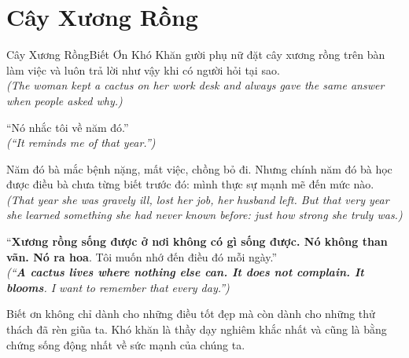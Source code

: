 \section{Cây Xương Rồng}
\begin{truyen}{Cây Xương Rồng}{Biết Ơn Khó Khăn}
gười phụ nữ đặt cây xương rồng trên bàn làm việc và luôn trả lời như vậy khi có người hỏi tại sao.\\
\textit{(The woman kept a cactus on her work desk and always gave the same answer when people asked why.)}

``Nó nhắc tôi về năm đó.''\\
\textit{(``It reminds me of that year.'')}

Năm đó bà mắc bệnh nặng, mất việc, chồng bỏ đi. Nhưng chính năm đó bà học được điều bà chưa từng biết trước đó: mình thực sự mạnh mẽ đến mức nào.\\
\textit{(That year she was gravely ill, lost her job, her husband left. But that very year she learned something she had never known before: just how strong she truly was.)}

``\textbf{Xương rồng sống được ở nơi không có gì sống được. Nó không than vãn. Nó ra hoa}. Tôi muốn nhớ đến điều đó mỗi ngày.''\\
\textit{(``\textbf{A cactus lives where nothing else can. It does not complain. It blooms}. I want to remember that every day.'')}
\end{truyen}
\begin{baihoc}
  Biết ơn không chỉ dành cho những điều tốt đẹp mà còn dành cho những thử thách đã rèn giũa ta. Khó khăn là thầy dạy nghiêm khắc nhất và cũng là bằng chứng sống động nhất về sức mạnh của chúng ta.
\end{baihoc}


